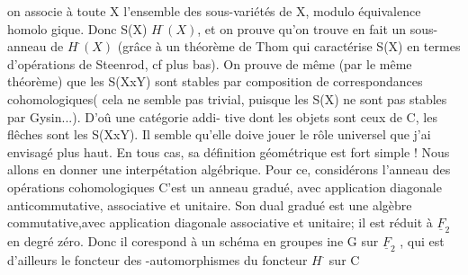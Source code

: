  on associe à toute X 
 l'ensemble  des sous-variétés  de X, modulo équivalence homolo%
gique. Donc S(X) \hand{$\subset$} $H^{\cdot}(X)$, et on prouve qu'on trouve en fait un sous-%
anneau de $H^{\cdot}(X)$ (grâce à un théorème de Thom qui caractérise S(X) en
termes d'opérations de Steenrod, cf plus bas). On prouve de même
(par le même théorème) que les S(XxY) sont stables par composition de
correspondances cohomologiques( cela ne semble pas trivial, puisque
les S(X) ne sont pas stables par Gysin...). D'oû une catégorie addi-%
tive dont les objets sont ceux de C, les flêches sont les S(XxY).
Il semble qu'elle doive jouer le rôle universel que j'ai envisagé
plus haut. En tous cas, sa définition géométrique est fort simple !
Nous allons en donner une interpétation algébrique. Pour ce,
considérons l'anneau des opérations cohomologiques   
\margin{\unsure{$\xi$}}
 C'est un anneau gradué, avec
application diagonale anticommutative,  associative et unitaire. Son
dual gradué est une algèbre  commutative,avec application diagonale
associative et unitaire; il est réduit à $\underline{F}_2$ en degré zéro. Donc il
corespond à un schéma en groupes ine G sur $\underline{F}_2$ , qui est d'ailleurs
le foncteur des \unsure{$\otimes$}-automorphismes  du foncteur $H^{\cdot}$ sur C 

